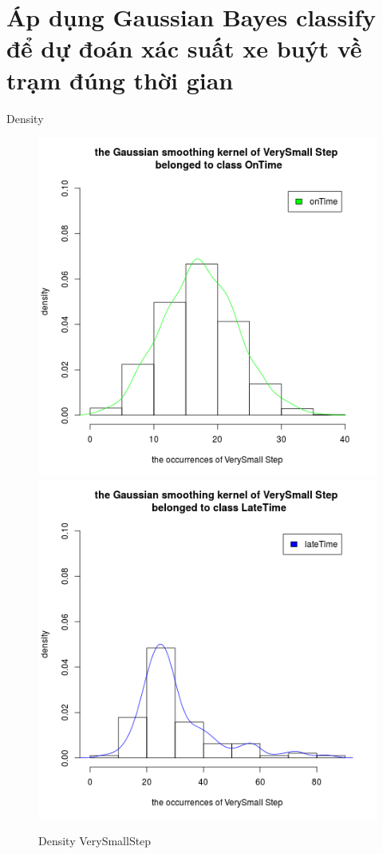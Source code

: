\documentclass[a4paper, 13pt]{report}
\begin{document}
\section{Áp dụng Gaussian Bayes classify để dự đoán xác suất xe buýt về trạm đúng thời gian}
Density 
\FloatBarrier
\begin{figure}[!htb]
  \includegraphics[width=\linewidth]{DensityVerySmallStep_OnTime}
\endminipage
{}
  \includegraphics[width=\linewidth]{DensityVerySmallStep_LateTime}
\endminipage
\caption*{Density VerySmallStep}
\end{figure}
\end{document}
